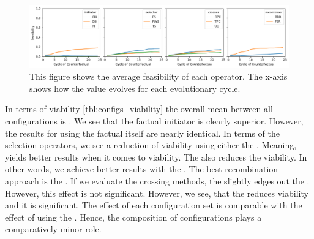 \documentclass[./../../paper.tex]{subfiles}
\begin{document}
\begin{figure}[htbp]
    \centering
    \includegraphics[width=\textwidth]{figures/generated/exp1_feasibility.png}
    \caption{This figure shows the average feasibility of each operator. The x-axis shows how the value evolves for each evolutionary cycle.}
    \label{fig:average-feasibility}
\end{figure}

In terms of viability \autoref{tbl:configs_viability} the overall mean between all configurations is . We see that the factual initiator is clearly superior. However, the results for using the factual itself are nearly identical. In terms of the selection operators, we see a reduction of viability using either the . Meaning,  yields better results when it comes to viability. The  also reduces the viability. In other words, we achieve better results with the . The best recombination approach is the . If we evaluate the crossing methods, the  slightly edges out the . However, this effect is not significant. However, we see, that the  reduces viability and it is significant. The effect of each configuration set is comparable with the effect of using the . Hence, the composition of configurations plays a comparatively minor role.
\end{document}
